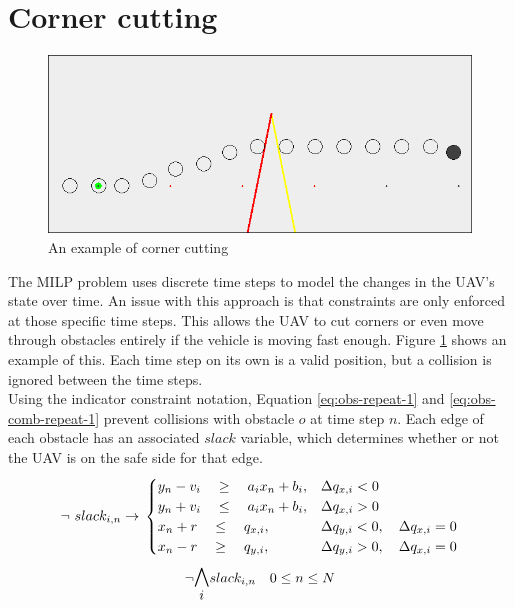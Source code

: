 \section{Corner cutting}
\label{subsec:corner-cutting}
\begin{figure}
\includegraphics[width=\textwidth]{img/cornercut_bad}
\caption{An example of corner cutting}
\label{fig:cornercut-example}
\end{figure}
The MILP problem uses discrete time steps to model the changes in the UAV's state over time. An issue with this approach is that constraints are only enforced at those specific time steps. This allows the UAV to cut corners or even move through obstacles entirely if the vehicle is moving fast enough. Figure \ref{fig:cornercut-example} shows an example of this. Each time step on its own is a valid position, but a collision is ignored between the time steps.\\
Using the indicator constraint notation, Equation \ref{eq:obs-repeat-1} and \ref{eq:obs-comb-repeat-1} prevent collisions with obstacle $o$ at time step $n$. Each edge of each obstacle has an associated $slack$ variable, which determines whether or not the UAV is on the safe side for that edge.
\begin{equation}
\label{eq:obs-repeat-1}
\neg ~ slack_{i,n} \rightarrow \\
\begin{cases}
y_{n} -  v_i \quad \geq 
\quad a_{i} x_{n} + b_{i},  	
& \Delta q_{x,i} < 0 							 	
 \\
y_{n} + v_i \quad \leq 
\quad a_{i} x_{n} + b_{i},
& \Delta q_{x,i} > 0 							 	
 \\
x_{n} + r \quad \leq
\quad  q_{x,i}, 		
& \Delta q_{y,i} < 0, \quad \Delta q_{x,i} = 0 	
 \\
x_{n} - r \quad \geq 
\quad q_{y,i},  		
& \Delta q_{y,i} > 0, \quad \Delta q_{x,i} = 0 	
\end{cases}
\end{equation}
\begin{equation}
\label{eq:obs-comb-repeat-1}
\neg \mathlarger{\mathlarger{\bigwedge_{i}}} slack_{i,n} \quad 0 \leq n \leq N
\end{equation}
